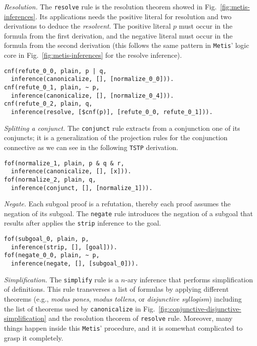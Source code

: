 \documentclass[../main.tex]{subfiles}
\begin{document}

\textit{Resolution.} The \verb!resolve! rule is the resolution
theorem showed in Fig.~\ref{fig:metis-inferences}. Its applications
needs the positive literal for resolution and two
derivations to deduce the \emph{resolvent}.
The positive literal $p$ must occur in the formula from the first derivation,
and the negative literal must occur in the formula from the second derivation
(this follows the same pattern in \verb!Metis!' logic core in
Fig.~\ref{fig:metis-inferences} for the resolve inference).

\begin{verbatim}
cnf(refute_0_0, plain, p | q,
  inference(canonicalize, [], [normalize_0_0])).
cnf(refute_0_1, plain, ~ p,
  inference(canonicalize, [], [normalize_0_4])).
cnf(refute_0_2, plain, q,
  inference(resolve, [$cnf(p)], [refute_0_0, refute_0_1])).
\end{verbatim}


\textit{Splitting a conjunct.}
The \verb!conjunct! rule extracts from a conjunction one of its conjuncts; it is
a generalization of the projection rules for the conjunction connective as
we can see in the following \verb!TSTP! derivation.

\begin{verbatim}
fof(normalize_1, plain, p & q & r,
  inference(canonicalize, [], [x])).
fof(normalize_2, plain, q,
  inference(conjunct, [], [normalize_1])).
\end{verbatim}

\textit{Negate.}
Each subgoal proof is a refutation, thereby each proof assumes
the negation of its subgoal. The \verb!negate! rule
introduces the negation of a subgoal that results
after applies the \verb!strip! inference to the goal.

\begin{verbatim}
fof(subgoal_0, plain, p,
  inference(strip, [], [goal])).
fof(negate_0_0, plain, ~ p,
  inference(negate, [], [subgoal_0])).
\end{verbatim}


\textit{Simplification.} %
The \verb!simplify! rule is a $n$-ary inference that performs simplification
of definitions. This rule transverses a list of formulas by
applying different theorems (e.g., \emph{modus pones}, \emph{modus tollens},
or \emph{disjunctive syllogism}) including the list of theorems used by
\verb!canonicalize! in Fig.~\ref{fig:conjunctive-disjunctive-simplification}
and the resolution theorem of \verb!resolve! rule.
Moreover, many things happen inside this \verb!Metis!' procedure, and
it is somewhat complicated to grasp it completely.
\end{document}
